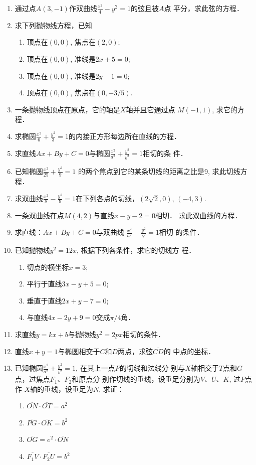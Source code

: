 \begin{enumerate}
\item 通过点$A(3,-1)$作双曲线$\frac{x^2}{4}-y^2=1$的弦且被$A$点
平分，求此弦的方程．
\item 求下列抛物线方程，已知
\begin{enumerate}
    \item 顶点在$(0,0)$, 焦点在$(2,0)$;
    \item 顶点在$(0,0)$, 准线是$2x+5=0$;
    \item 顶点在$(0,0)$, 准线是$2y-1=0$;
    \item 顶点在$(0,0)$, 焦点在$(0,-3/5)$.
\end{enumerate}

\item 一条抛物线顶点在原点，它的轴是$X$轴并且它通过点
$M(-1,1)$, 求它的方程．

\item 求椭圆$\frac{x^2}{6}+\frac{y^2}{3}=1$的内接正方形每边所在直线的方程．
\item 求直线$Ax+By+C=0$与椭圆$\frac{x^2}{a^2}+\frac{y^2}{b^2}=1$相切的条
件．

\item 已知椭圆$\frac{x^2}{25}+\frac{y^2}{9}=1$
的两个焦点到它的某条切线的距离之比是9, 求此切线方程．
\item 求双曲线$\frac{x^2}{8}-\frac{y^2}{9}=1$在下列各点的切线，$(2\sqrt{2},0)$, $(-4,3)$.
\item 一条双曲线在点$M(4,2)$与直线$x-y-2=0$相切．
求此双曲线的方程．
\item 求直线：$Ax+By+C=0$与双曲线
$\frac{x^2}{a^2}-\frac{y^2}{b^2}=1$相切
的条件．
\item 已知抛物线$y^2=12x$, 根据下列各条件，求它的切线方
程．
\begin{enumerate}
\item 切点的横坐标$x=3$;
\item 平行于直线$3x-y+5=0$;
\item 垂直于直线$2x+y-7=0$;
\item 与直线$4x-2y+9=0$交成$\pi/4$角．
\end{enumerate}

\item 求直线$y=kx+b$与抛物线$y^2=2px$相切的条件．
\item 直线$x+y=1$与椭圆相交于$C$和$D$两点，求弦$\overline{CD}$的
中点的坐标．
\item 已知椭圆$\frac{x^2}{a^2}+\frac{y^2}{b^2}=1$, 在其上一点$P$的切线和法线分
别与$X$轴相交于$T$点和$G$点，过焦点$F_1$、$F_2$和原点分
别作切线的垂线，设垂足分别为$V$、$U$、$K$, 过$P$点作
$X$轴的垂线，设垂足为$N$, 求证：
\begin{enumerate}
    \item $\overline{ON}\cdot \overline{OT}=a^2$
    \item $\overline{PG}\cdot \overline{OK}=b^2$
    \item $\overline{OG}=e^2\cdot \overline{ON}$
    \item $\overline{F_1V}\cdot  \overline{F_2U}=b^2$
\end{enumerate}
\end{enumerate}


